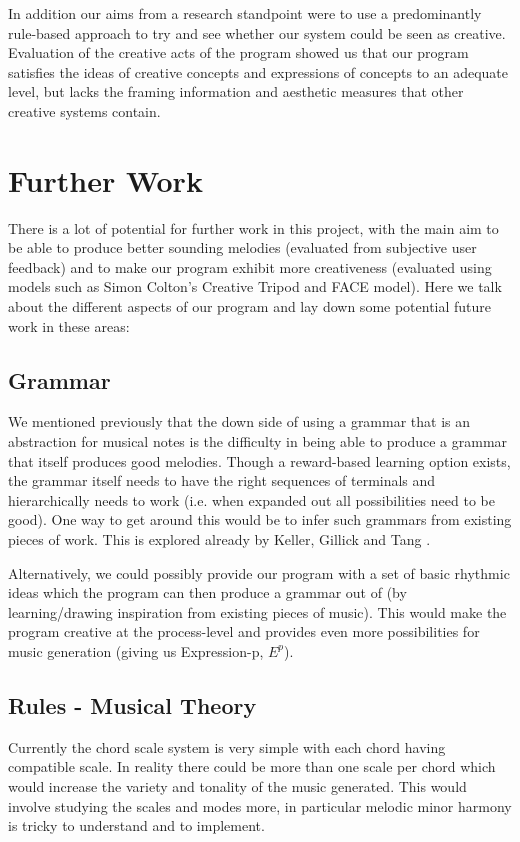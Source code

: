 \documentclass[pdftex,12pt,a4paper]{report}
\begin{document}
In addition our aims from a research standpoint were to use a predominantly rule-based approach to try and see whether our system could be seen as creative. Evaluation of the creative acts of the program showed us that our program satisfies the ideas of creative concepts and expressions of concepts to an adequate level, but lacks the framing information and aesthetic measures that other creative systems contain. 


\section{Further Work}
There is a lot of potential for further work in this project, with the main aim to be able to produce better sounding melodies (evaluated from subjective user feedback) and to make our program exhibit more creativeness (evaluated using models such as Simon Colton's Creative Tripod and FACE model). Here we talk about the different aspects of our program and lay down some potential future work in these areas:

\subsection{Grammar}
We mentioned previously that the down side of using a grammar that is an abstraction for musical notes is the difficulty in being able to produce a grammar that itself produces good melodies. Though a reward-based learning option exists, the grammar itself needs to have the right sequences of terminals and hierarchically needs to work (i.e. when expanded out all possibilities need to be good). One way to get around this would be to infer such grammars from existing pieces of work. This is explored already by Keller, Gillick and Tang \cite{kellergillick09}. 

Alternatively, we could possibly provide our program with a set of basic rhythmic ideas which the program can then produce a grammar out of (by learning/drawing inspiration from existing pieces of music). This would make the program creative at the process-level and provides even more possibilities for music generation (giving us Expression-p, $E^{p}$).

\subsection{Rules - Musical Theory}
Currently the chord scale system is very simple with each chord having compatible scale. In reality there could be more than one scale per chord which would increase the variety and tonality of the music generated. This would involve studying the scales and modes more, in particular melodic minor harmony is tricky to understand and to implement.
\end{document}
